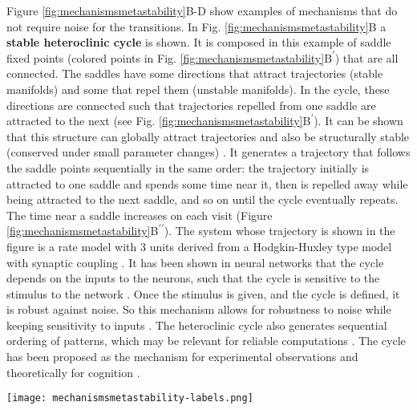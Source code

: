 \documentclass[reprint,onecolumn,superscriptaddress,showpacs,amsmath,amssymb,aps,floatfix]{revtex4-2}
\theoremstyle{definition}
\newcommand{\Emph}[1]{\textbf{#1}}
\newcommand*{\everymodeprime}{\ensuremath{\prime}}
\begin{document}
Figure \ref{fig:mechanismsmetastability}B-D show examples of mechanisms that do not require noise for the transitions.
In Fig. \ref{fig:mechanismsmetastability}B a \Emph{stable heteroclinic cycle} is shown. It is composed in this example of saddle fixed points (colored points in Fig. \ref{fig:mechanismsmetastability}B\textsuperscript{\everymodeprime}) that are all connected. The saddles have some directions that attract trajectories (stable manifolds) and some that repel them (unstable manifolds). In the cycle, these directions are connected such that trajectories repelled from one saddle are attracted to the next (see Fig. \ref{fig:mechanismsmetastability}B\textsuperscript{\everymodeprime}). 
It can be shown that this structure can globally attract trajectories \cite{nowotny2007dynamical} and also be structurally stable (conserved under small parameter changes) \cite{rabinovich2008transientcognitive}. 
It generates a trajectory that follows the saddle points sequentially in the same order: the trajectory initially is attracted to one saddle and spends some time near it, then is repelled away while being attracted to the next saddle, and so on until the cycle eventually repeats. The time near a saddle increases on each visit (Figure \ref{fig:mechanismsmetastability}B\textsuperscript{\everymodeprime\everymodeprime}). The system whose trajectory is shown in the figure is a rate model with $3$ units derived from a Hodgkin-Huxley type model with synaptic coupling \cite{ashwin2011criteria}.
It has been shown in neural networks that the cycle depends on the inputs to the neurons, such that the cycle is sensitive to the stimulus to the network \cite{rabinovich2001dynamical}. Once the stimulus is given, and the cycle is defined, it is robust against noise. So this mechanism allows for robustness to noise while keeping sensitivity to inputs \cite{rabinovich2001dynamical, rabinovich2008transientcognitive}.  The heteroclinic cycle also generates sequential ordering of patterns, which may be relevant for reliable computations \cite{fonollosa2015learning}. The cycle has been proposed as the mechanism for experimental observations \cite{rabinovich2008transientcognitive, rabinovich2012information} and theoretically for cognition \cite{fonollosa2015learning, rabinovich2014chunking}.

%
\begin{figure*}[hbt]
    \centering
    \texttt{[image: mechanismsmetastability-labels.png]}
    \caption{\textbf{Dynamical mechanisms of metastability.} Each column corresponds to one mechanism, with the panels respectively showing a representative time-series, trajectories in state space, and the distribution of residence times in each identified metastable state. Further details in the main text and Supplemental Material.}
    \label{fig:mechanismsmetastability}
\end{figure*}
\end{document}
